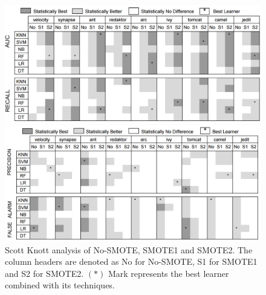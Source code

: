 \begin{figure}[!htbp]
\begin{minipage}{.5\linewidth}
\centering
        \includegraphics[width=.9\linewidth]{./fig/AUC_recall.png}
            \end{minipage}%
\begin{minipage}{.5\linewidth}
        \centering
        \includegraphics[width=.9\linewidth]{./fig/prec_pf.png}
    \end{minipage}%
    \caption{Scott Knott analysis of No-SMOTE, SMOTE1 and SMOTE2. The column headers are denoted as No for No-SMOTE, S1 for SMOTE1 and S2 for SMOTE2. $(\ast)$ Mark represents the best learner combined with its techniques.}
    \label{fig:stats}
\vspace{-0.2cm}
\end{figure}

